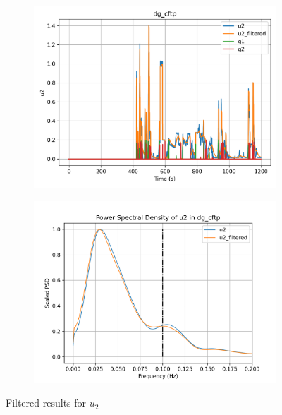 \begin{figure}[H]

\begin{minipage}{0.49\textwidth}
        \begin{figure}[H]
                \centering
                \includegraphics[width = \textwidth]{./figs/tst_filt/dg_cftp/u2.png}
        \end{figure}
\end{minipage}
\begin{minipage}{0.49\textwidth}
        \begin{figure}[H]
                \centering
                \includegraphics[width = \textwidth]{./figs/tst_filt/dg_cftp/u2_psd.png}
        \end{figure}
\end{minipage}
\caption{Filtered results for $u_2$}

\end{figure}


